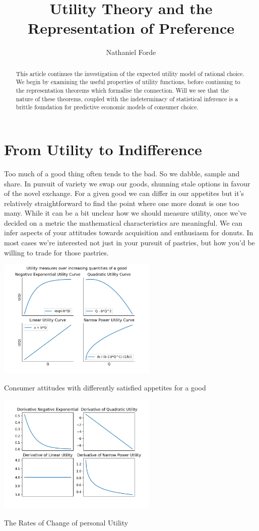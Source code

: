 \documentclass{tufte-handout}
\title{Utility Theory and the Representation of Preference}
\author[Nathaniel Forde]{Nathaniel Forde}
\begin{document}
\maketitle%

\begin{abstract}
\noindent
This article continues the investigation of the expected utility model of rational choice. We begin by examining the useful properties of utility functions, before continuing to the representation theorems which formalise the connection. Will we see that the nature of these theorems, coupled with the indeterminacy of statistical inference is a brittle foundation for predictive economic models of consumer choice.
\end{abstract}


\section{From Utility to Indifference}
Too much of a good thing often tends to the bad. So we dabble, sample and share. In pursuit of variety we swap our goods, shunning stale options in favour of the novel exchange.  For a given good we can differ in our appetites but it's relatively straightforward to find the point where one more donut is one too many. While it can be a bit unclear how we should measure utility, once we've decided on a metric the mathematical characteristics are meaningful. We can infer aspects of your attitudes towards acquisition and enthusiasm for donuts. In most cases we're interested not just in your pursuit of pastries, but how you'd be willing to trade for those pastries. 

\begin{marginfigure}
\includegraphics[width=3in]{Plots/utility_in_1_dimension.png}
\caption{Consumer attitudes with differently satisfied appetites for a good}
\includegraphics[width=3in]{Plots/derivatives_of_utility.png}
\caption{The Rates of Change of personal Utility}
\end{marginfigure} 
\end{document}
